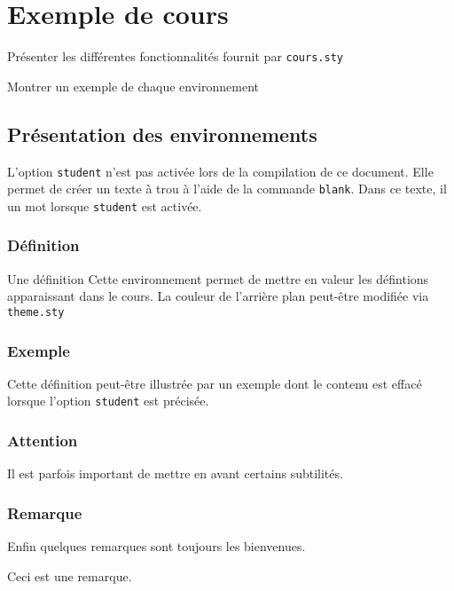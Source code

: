 \documentclass[12pt, fleqn]{book}
\begin{document}
\dominitoc
\tableofcontents
\chapter{Exemple de cours}
\begin{objectif}
	\item Présenter les différentes 
	fonctionnalités fournit par \texttt{cours.sty}
	\item Montrer un exemple de chaque environnement
\end{objectif}

\section{Présentation des environnements}
L'option \texttt{student} n'est pas activée lors de la compilation de ce document.
Elle permet de créer un texte à trou à l'aide de la commande
\texttt{blank}. Dans ce texte, il  un mot lorsque \texttt{student}
est activée.
\subsection{Définition}
\begin{defn}{Une définition}
	Cette environnement permet de mettre en valeur les défintions 
	apparaissant dans le cours. La couleur de l'arrière plan peut-être
	modifiée via \texttt{theme.sty}
\end{defn}
\subsection{Exemple}
Cette définition peut-être illustrée par un exemple dont le contenu est effacé
lorsque l'option \texttt{student} est précisée.
\begin{exemple}
	\lipsum[1]
\end{exemple}
\subsection{Attention}
Il est parfois important de mettre en avant certains subtilités.
\begin{attention}
	\lipsum[1]
\end{attention}
\subsection{Remarque}
Enfin quelques remarques sont toujours les bienvenues.
\begin{rema}
	Ceci est une remarque.
\end{rema}
\end{document}
